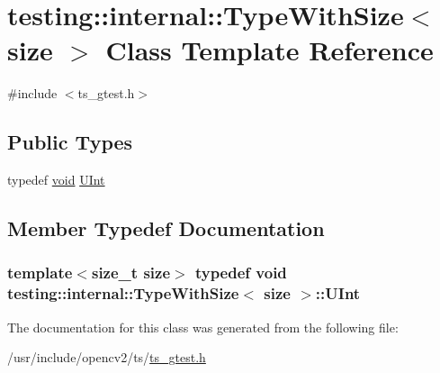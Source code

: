 \hypertarget{classtesting_1_1internal_1_1TypeWithSize}{\section{testing\-:\-:internal\-:\-:Type\-With\-Size$<$ size $>$ Class Template Reference}
\label{classtesting_1_1internal_1_1TypeWithSize}
}


{\ttfamily \#include $<$ts\-\_\-gtest.\-h$>$}

\subsection*{Public Types}
\begin{DoxyCompactItemize}
\item 
typedef \hyperlink{legacy_8hpp_a8bb47f092d473522721002c86c13b94e}{void} \hyperlink{classtesting_1_1internal_1_1TypeWithSize_a3898640d9f6c1e18110eef90f47a5d7b}{U\-Int}
\end{DoxyCompactItemize}


\subsection{Member Typedef Documentation}
\hypertarget{classtesting_1_1internal_1_1TypeWithSize_a3898640d9f6c1e18110eef90f47a5d7b}{
\subsubsection[{U\-Int}]{\setlength{\rightskip}{0pt plus 5cm}template$<$size\-\_\-t size$>$ typedef {\bf void} {\bf testing\-::internal\-::\-Type\-With\-Size}$<$ {\bf size} $>$\-::{\bf U\-Int}}}\label{classtesting_1_1internal_1_1TypeWithSize_a3898640d9f6c1e18110eef90f47a5d7b}


The documentation for this class was generated from the following file\-:\begin{DoxyCompactItemize}
\item 
/usr/include/opencv2/ts/\hyperlink{ts__gtest_8h}{ts\-\_\-gtest.\-h}\end{DoxyCompactItemize}
